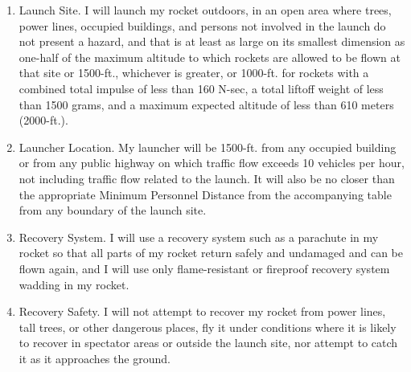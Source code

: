 \begin{enumerate}
	\item Launch Site. I will launch my rocket outdoors, in an open area where trees, power lines, occupied buildings, and persons not involved in the launch do not present a hazard, and that is at least as large on its smallest dimension as one-half of the maximum altitude to which rockets are allowed to be flown at that site or 1500-ft., whichever is greater, or 1000-ft. for rockets with a combined total impulse of less than 160 N-sec, a total liftoff weight of less than 1500 grams, and a maximum expected altitude of less than 610 meters (2000-ft.).\par

	\item Launcher Location. My launcher will be 1500-ft. from any occupied building or from any public highway on which traffic flow exceeds 10 vehicles per hour, not including traffic flow related to the launch. It will also be no closer than the appropriate Minimum Personnel Distance from the accompanying table from any boundary of the launch site.\par

	\item Recovery System. I will use a recovery system such as a parachute in my rocket so that all parts of my rocket return safely and undamaged and can be flown again, and I will use only flame-resistant or fireproof recovery system wadding in my rocket.\par

	\item Recovery Safety. I will not attempt to recover my rocket from power lines, tall trees, or other dangerous places, fly it under conditions where it is likely to recover in spectator areas or outside the launch site, nor attempt to catch it as it approaches the ground.
\end{enumerate}\par